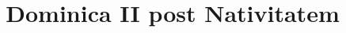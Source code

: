 \documentclass[17pt]{extarticle}
\begin{document}
\title{Dominica II post Nativitatem}
\makereadingtitle

\end{document}
